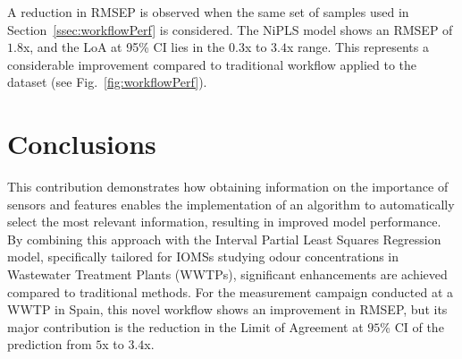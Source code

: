 \documentclass[final,3p,times,twocolumn]{elsarticle}
\begin{document}



A reduction in RMSEP is observed when the same set of samples used in Section~\ref{ssec:workflowPerf} is considered. The NiPLS model shows an RMSEP of $1.8$x, and the LoA at 95\% CI lies in the $0.3$x to $3.4$x range. This represents a considerable improvement compared to traditional workflow applied to the dataset (see Fig.~\ref{fig:workflowPerf}).

\section{Conclusions}
\label{sec:conclusions}


This contribution demonstrates how obtaining information on the importance of sensors and features enables the implementation of an algorithm to automatically select the most relevant information, resulting in improved model performance. By combining this approach with the Interval Partial Least Squares Regression model, specifically tailored for IOMSs studying odour concentrations in Wastewater Treatment Plants (WWTPs), significant enhancements are achieved compared to traditional methods. For the measurement campaign conducted at a WWTP in Spain, this novel workflow shows an improvement in RMSEP, but its major contribution is the reduction in the Limit of Agreement at $95$\% CI of the prediction from $5$x to $3.4$x.
\end{document}
